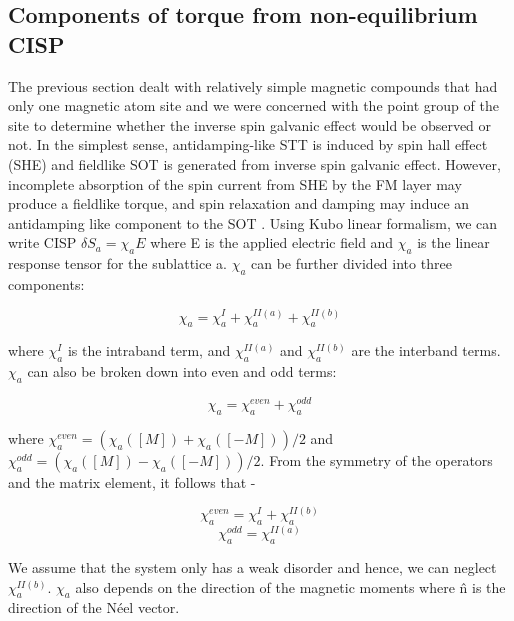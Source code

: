 \documentclass[10pt,doublespacing,edeposit]{uiucthesis2020}
\begin{document}
\begin{mainmatter}
\section{Components of torque from non-equilibrium CISP}


The previous section dealt with relatively simple magnetic compounds that had only one magnetic atom site and we were concerned with the point group of the site to determine whether the inverse spin galvanic effect would be observed or not. In the simplest sense, antidamping-like STT is induced by spin hall effect (SHE) and fieldlike SOT is generated from inverse spin galvanic effect. However, incomplete absorption of the spin current from SHE by the FM layer may produce a fieldlike torque, and spin relaxation and damping may induce an antidamping like component to the SOT \cite{Zelezny2017}. Using Kubo linear formalism, we can write CISP $\delta S_a = \chi_a E$ where E is the applied electric field and $\chi_a$ is the linear response tensor for the sublattice a. $\chi_a$ can be further divided into three components:

\begin{equation}
\chi_a = \chi_a^I + \chi_a^{II(a)} + \chi_a^{II(b)}
\end{equation}

where $\chi_a^I$ is the intraband term, and $\chi_a^{II(a)}$ and $\chi_a^{II(b)}$ are the interband terms. $\chi_a$ can also be broken down into even and odd terms:

\begin{equation}
\chi_a = \chi_a^{even} + \chi_a^{odd}
\end{equation}

where $\chi_a^{even} = (\chi_a([M])+\chi_a([-M]))/2$ and $\chi_a^{odd} = (\chi_a([M])-\chi_a([-M]))/2$. From the symmetry of the operators and the matrix element, it follows that -

\begin{equation}
\chi_a^{even} = \chi_a^{I} + \chi_a^{II(b)}
\end{equation}
\begin{equation}
\chi_a^{odd} = \chi_a^{II(a)}
\end{equation}

We assume that the system only has a weak disorder and hence, we can neglect $\chi_a^{II(b)}$. $\chi_a$ also depends on the direction of the magnetic moments where \^n is the direction of the N\'eel vector.


\end{mainmatter}
\end{document}
